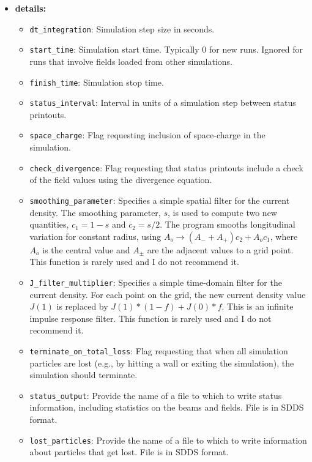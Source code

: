 \begin{itemize}
\item {\bf details:} 
\begin{itemize}
    \item {\tt dt\_integration}: Simulation step size in seconds.
    \item {\tt start\_time}: Simulation start time.  Typically 0 for new runs.
        Ignored for runs that involve fields loaded from other simulations.
    \item {\tt finish\_time}: Simulation stop time.
    \item {\tt status\_interval}: Interval in units of a simulation step between 
        status printouts.
    \item {\tt space\_charge}: Flag requesting inclusion of space-charge in the
        simulation.
    \item {\tt check\_divergence}: Flag requesting that status printouts include
        a check of the field values using the divergence equation.
    \item {\tt smoothing\_parameter}: Specifies a simple spatial filter for the
        current density.  The smoothing parameter, $s$, is used to compute two
        new quantities, $c_1 = 1-s$ and $c_2 = s/2$.  The program smooths longitudinal
        variation for constant radius, using $A_o \rightarrow (A_- + A_+)c_2 + A_o c_1$,
        where $A_o$ is the central value and $A_\pm$ are the adjacent values to a grid point.
        This function is rarely used and I do not recommend it.
    \item {\tt J\_filter\_multiplier}: Specifies a simple time-domain filter for the
        current density.  For each point on the grid, the new current density value $J(1)$ is
        replaced by $J(1)*(1-f) + J(0)*f$.  This is an infinite impulse response filter.
        This function is rarely used and I do not recommend it.
    \item {\tt terminate\_on\_total\_loss}: Flag requesting that when all simulation particles
        are lost (e.g., by hitting a wall or exiting the simulation), the simulation should
        terminate.
    \item {\tt status\_output}: Provide the name of a file to which to write status information,
        including statistics on the beams and fields.  File is in SDDS format.
    \item {\tt lost\_particles}: Provide the name of a file to which to write information about
        particles that get lost.  File is in SDDS format.
\end{itemize}

\end{itemize}

